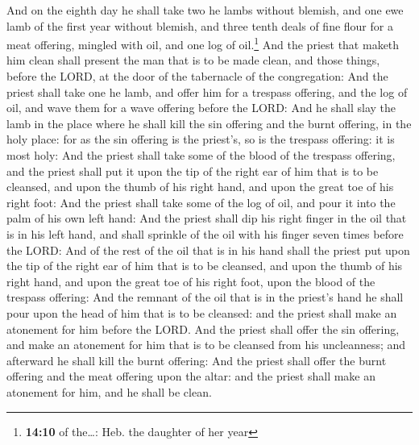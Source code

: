  And on the eighth day he shall take two he lambs without
blemish, and one ewe lamb of the first year without blemish, and three
tenth deals of fine flour for a meat offering, mingled with oil, and one
log of oil.\footnote{\textbf{14:10} of the\ldots: Heb. the daughter of
  her year}  And the priest that maketh him clean shall
present the man that is to be made clean, and those things, before the
LORD, at the door of the tabernacle of the congregation: 
And the priest shall take one he lamb, and offer him for a trespass
offering, and the log of oil, and wave them for a wave offering before
the LORD:  And he shall slay the lamb in the place where
he shall kill the sin offering and the burnt offering, in the holy
place: for as the sin offering is the priest's, so is the trespass
offering: it is most holy:  And the priest shall take
some of the blood of the trespass offering, and the priest shall put it
upon the tip of the right ear of him that is to be cleansed, and upon
the thumb of his right hand, and upon the great toe of his right foot:
 And the priest shall take some of the log of oil, and
pour it into the palm of his own left hand:  And the
priest shall dip his right finger in the oil that is in his left hand,
and shall sprinkle of the oil with his finger seven times before the
LORD:  And of the rest of the oil that is in his hand
shall the priest put upon the tip of the right ear of him that is to be
cleansed, and upon the thumb of his right hand, and upon the great toe
of his right foot, upon the blood of the trespass offering:
 And the remnant of the oil that is in the priest's hand
he shall pour upon the head of him that is to be cleansed: and the
priest shall make an atonement for him before the LORD. 
And the priest shall offer the sin offering, and make an atonement for
him that is to be cleansed from his uncleanness; and afterward he shall
kill the burnt offering:  And the priest shall offer the
burnt offering and the meat offering upon the altar: and the priest
shall make an atonement for him, and he shall be clean.

